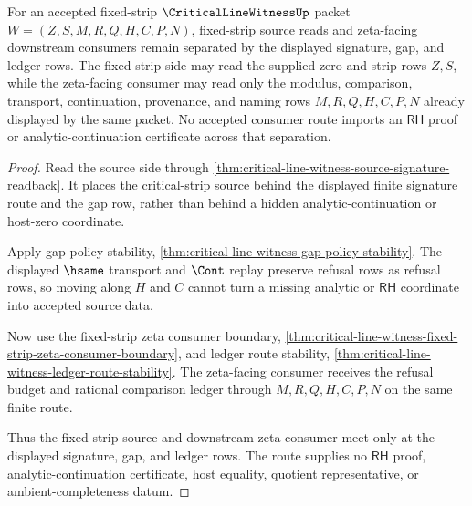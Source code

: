 \begin{theorem}
\label{thm:critical-line-witness-fixed-strip-zeta-consumer-separation}
For an accepted fixed-strip $\CriticalLineWitnessUp$ packet
$W=(Z,S,M,R,Q,H,C,P,N)$, fixed-strip source reads and zeta-facing downstream
consumers remain separated by the displayed signature, gap, and ledger rows.
The fixed-strip side may read the supplied zero and strip rows $Z,S$, while
the zeta-facing consumer may read only the modulus, comparison, transport,
continuation, provenance, and naming rows $M,R,Q,H,C,P,N$ already displayed
by the same packet. No accepted consumer route imports an $\mathsf{RH}$ proof
or analytic-continuation certificate across that separation.
\end{theorem}
\begin{proof}
Read the source side through
\autoref{thm:critical-line-witness-source-signature-readback}. It places the
critical-strip source behind the displayed finite signature route and the
gap row, rather than behind a hidden analytic-continuation or host-zero
coordinate.

Apply gap-policy stability,
\autoref{thm:critical-line-witness-gap-policy-stability}. The displayed
$\hsame$ transport and $\Cont$ replay preserve refusal rows as refusal rows,
so moving along $H$ and $C$ cannot turn a missing analytic or $\mathsf{RH}$
coordinate into accepted source data.

Now use the fixed-strip zeta consumer boundary,
\autoref{thm:critical-line-witness-fixed-strip-zeta-consumer-boundary}, and
ledger route stability,
\autoref{thm:critical-line-witness-ledger-route-stability}. The zeta-facing
consumer receives the refusal budget and rational comparison ledger through
$M,R,Q,H,C,P,N$ on the same finite route.

Thus the fixed-strip source and downstream zeta consumer meet only at the
displayed signature, gap, and ledger rows. The route supplies no
$\mathsf{RH}$ proof, analytic-continuation certificate, host equality,
quotient representative, or ambient-completeness datum.
\end{proof}

